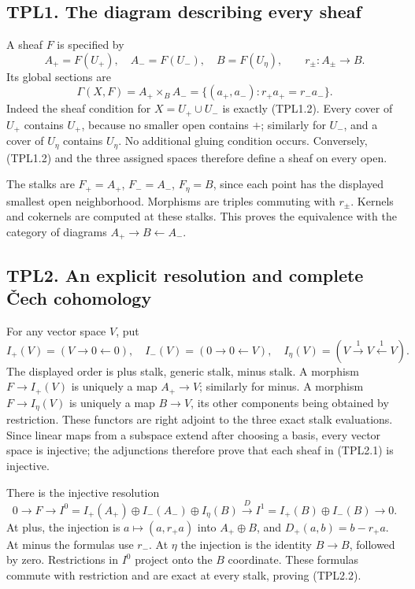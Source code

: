 \subsection{TPL1. The diagram describing every
sheaf}\label{tpl1.-the-diagram-describing-every-sheaf}

A sheaf \(F\) is specified by \[
A_+=F(U_+),\quad A_-=F(U_-),\quad B=F(U_\eta),
\qquad r_\pm:A_\pm\to B.
\tag{TPL1.1}
\] Its global sections are \[
\Gamma(X,F)=A_+\times_BA_-=
\{(a_+,a_-):r_+a_+=r_-a_-\}.
\tag{TPL1.2}
\] Indeed the sheaf condition for \(X=U_+\cup U_-\) is exactly (TPL1.2).
Every cover of \(U_+\) contains \(U_+\), because no smaller open
contains \(+\); similarly for \(U_-\), and a cover of \(U_\eta\)
contains \(U_\eta\). No additional gluing condition occurs. Conversely,
(TPL1.2) and the three assigned spaces therefore define a sheaf on every
open.

The stalks are \(F_+=A_+\), \(F_-=A_-\), \(F_\eta=B\), since each point
has the displayed smallest open neighborhood. Morphisms are triples
commuting with \(r_\pm\). Kernels and cokernels are computed at these
stalks. This proves the equivalence with the category of diagrams
\(A_+\to B\leftarrow A_-\).

\subsection{TPL2. An explicit resolution and complete Čech
cohomology}\label{tpl2.-an-explicit-resolution-and-complete-ux10dech-cohomology}

For any vector space \(V\), put \[
I_+(V)=(V\to0\leftarrow0),\quad
I_-(V)=(0\to0\leftarrow V),\quad
I_\eta(V)=(V\xrightarrow{1}V\xleftarrow{1}V).
\tag{TPL2.1}
\] The displayed order is plus stalk, generic stalk, minus stalk. A
morphism \(F\to I_+(V)\) is uniquely a map \(A_+\to V\); similarly for
minus. A morphism \(F\to I_\eta(V)\) is uniquely a map \(B\to V\), its
other components being obtained by restriction. These functors are right
adjoint to the three exact stalk evaluations. Since linear maps from a
subspace extend after choosing a basis, every vector space is injective;
the adjunctions therefore prove that each sheaf in (TPL2.1) is
injective.

There is the injective resolution \[
0\to F\to
I^0=I_+(A_+)\oplus I_-(A_-)\oplus I_\eta(B)
\xrightarrow D I^1=I_+(B)\oplus I_-(B)\to0.
\tag{TPL2.2}
\] At plus, the injection is \(a\mapsto(a,r_+a)\) into \(A_+\oplus B\),
and \(D_+(a,b)=b-r_+a\). At minus the formulas use \(r_-\). At \(\eta\)
the injection is the identity \(B\to B\), followed by zero. Restrictions
in \(I^0\) project onto the \(B\) coordinate. These formulas commute
with restriction and are exact at every stalk, proving (TPL2.2).

